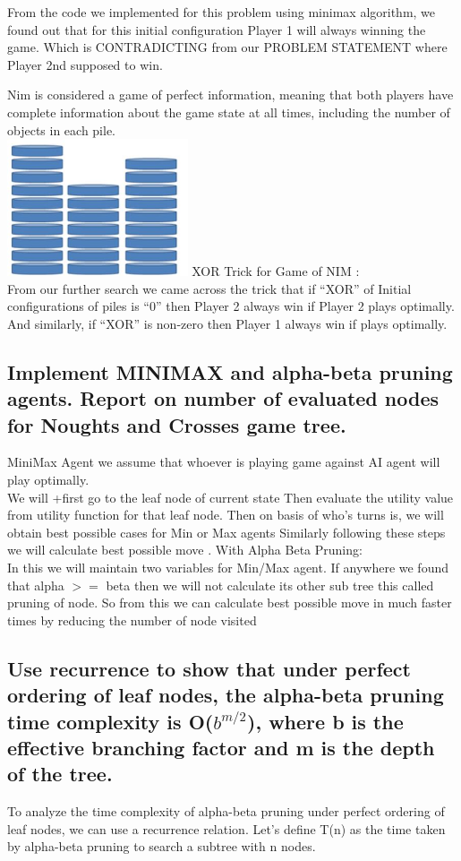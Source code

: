 \documentclass[15pt,journal]{IEEEtran}
\begin{document}
From the code we implemented for this problem using                   minimax algorithm, we found out that for this initial                          configuration Player 1 will always winning the game.
Which is CONTRADICTING from our PROBLEM
      STATEMENT  where Player 2nd supposed to win.


Nim is considered a game of perfect information, meaning that both                             players have complete information about the game state at all times,                            including the number of objects in each pile.\\
\includegraphics[width=0.4\textwidth]{image/nim.jpg}
XOR Trick for Game of NIM :\\
From our further search we came across the trick  that if “XOR” of Initial configurations of piles is “0” then Player 2 always win if Player 2 plays optimally.
And similarly, if “XOR” is non-zero then Player 1 always win if plays optimally.
\subsection{Implement \cite{adversarial}MINIMAX and alpha-beta pruning agents. Report on number of evaluated nodes for Noughts and Crosses game tree.}
MiniMax Agent we assume that whoever is playing game against AI agent will play optimally.\\
We will +first go to the leaf node of current state
Then evaluate the utility value from utility function for that leaf node.
Then on basis of who’s turns is, we will obtain best possible cases for Min or Max agents
Similarly following these steps we will calculate best possible move .
With Alpha Beta Pruning:\\
In this we will maintain two variables for Min/Max agent.
If anywhere we found that alpha $>=$ beta then we will not calculate its other sub tree this called pruning of node.
So from this we can calculate best possible move in much faster times by reducing the number of node visited
\subsection{ Use recurrence to show that under perfect ordering of leaf nodes, the alpha-beta pruning time complexity is O($b^{m/2}$), where b is the effective branching factor and m is the depth of the tree.}
To analyze the time complexity of alpha-beta pruning under perfect ordering of leaf nodes, we can use a recurrence relation. Let's define T(n) as the time taken by alpha-beta pruning to search a subtree with n nodes.
\end{document}

